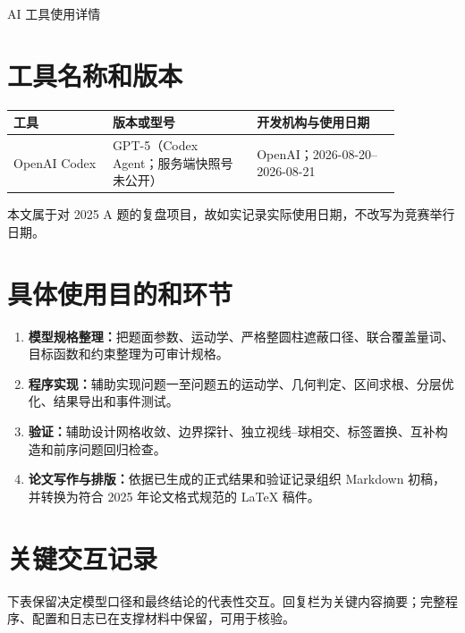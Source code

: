 \documentclass[UTF8,zihao=-4]{ctexart}
\begin{document}
\pagestyle{plain}
\begin{center}
  {\heiti{} AI 工具使用详情}
\end{center}

\section{工具名称和版本}

\begin{longtable}{>{\raggedright\arraybackslash}p{0.22\linewidth}>{\raggedright\arraybackslash}p{0.32\linewidth}>{\raggedright\arraybackslash}p{0.32\linewidth}}
\toprule
工具 & 版本或型号 & 开发机构与使用日期 \\
\midrule
OpenAI Codex & GPT-5（Codex Agent；服务端快照号未公开） & OpenAI；2026-08-20--2026-08-21 \\
\bottomrule
\end{longtable}

本文属于对 2025 A 题的复盘项目，故如实记录实际使用日期，不改写为竞赛举行日期。

\section{具体使用目的和环节}

\begin{enumerate}
  \item \textbf{模型规格整理：}把题面参数、运动学、严格整圆柱遮蔽口径、联合覆盖量词、目标函数和约束整理为可审计规格。
  \item \textbf{程序实现：}辅助实现问题一至问题五的运动学、几何判定、区间求根、分层优化、结果导出和事件测试。
  \item \textbf{验证：}辅助设计网格收敛、边界探针、独立视线--球相交、标签置换、互补构造和前序问题回归检查。
  \item \textbf{论文写作与排版：}依据已生成的正式结果和验证记录组织 Markdown 初稿，并转换为符合 2025 年论文格式规范的 LaTeX 稿件。
\end{enumerate}

\section{关键交互记录}

下表保留决定模型口径和最终结论的代表性交互。回复栏为关键内容摘要；完整程序、配置和日志已在支撑材料中保留，可用于核验。
\end{document}
